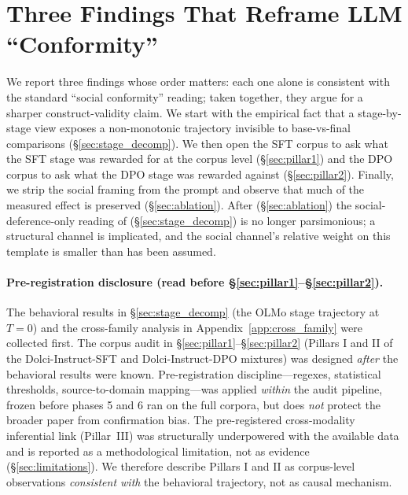 \documentclass{article}
\begin{document}
\section{Three Findings That Reframe LLM ``Conformity''}
\label{sec:results}

\noindent We report three findings whose order matters: each one alone is consistent with the standard ``social conformity'' reading; taken together, they argue for a sharper construct-validity claim. We start with the empirical fact that a stage-by-stage view exposes a non-monotonic trajectory invisible to base-vs-final comparisons (\S\ref{sec:stage_decomp}). We then open the SFT corpus to ask what the SFT stage was rewarded for at the corpus level (\S\ref{sec:pillar1}) and the DPO corpus to ask what the DPO stage was rewarded against (\S\ref{sec:pillar2}). Finally, we strip the social framing from the prompt and observe that much of the measured effect is preserved (\S\ref{sec:ablation}). After (\S\ref{sec:ablation}) the social-deference-only reading of (\S\ref{sec:stage_decomp}) is no longer parsimonious; a structural channel is implicated, and the social channel's relative weight on this template is smaller than has been assumed.

\paragraph{Pre-registration disclosure (read before \S\ref{sec:pillar1}--\S\ref{sec:pillar2}).}
The behavioral results in \S\ref{sec:stage_decomp} (the OLMo stage trajectory at $T{=}0$) and the cross-family analysis in Appendix~\ref{app:cross_family} were collected first. The corpus audit in \S\ref{sec:pillar1}--\S\ref{sec:pillar2} (Pillars I and II of the Dolci-Instruct-SFT and Dolci-Instruct-DPO mixtures) was designed \emph{after} the behavioral results were known. Pre-registration discipline---regexes, statistical thresholds, source-to-domain mapping---was applied \emph{within} the audit pipeline, frozen before phases 5 and 6 ran on the full corpora, but does \emph{not} protect the broader paper from confirmation bias. The pre-registered cross-modality inferential link (Pillar~III) was structurally underpowered with the available data and is reported as a methodological limitation, not as evidence (\S\ref{sec:limitations}). We therefore describe Pillars I and II as corpus-level observations \emph{consistent with} the behavioral trajectory, not as causal mechanism.
\end{document}
